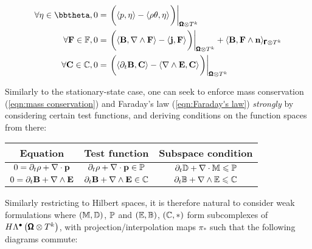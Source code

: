 \begin{align}
        \forall \eta \in \bbtheta,  0  &=  \left.\left(\langle p, \eta\rangle - \langle\rho\theta, \eta\rangle\tall\right)\right|_{\bfOmega\otimes T^{k}}  \\
        \forall \bfF \in \bbF,  0  &=  \left.\left(\langle\bfB, \nabla\wedge\bfF\rangle - \langle\bfj, \bfF\rangle\tall\right)\right|_{\bfOmega\otimes T^{k}} + \langle\bfB, \bfF\wedge\bfn\rangle_{\bfGamma\otimes T^{k}}  \\
        \forall \bfC \in \bbC,  0  &=  \left.\left(\langle\partial_{t}\bfB, \bfC\rangle - \langle\nabla\wedge\bfE, \bfC\rangle\tall\right)\right|_{\bfOmega\otimes T^{k}}
    \end{align}

    \line

     Similarly to the stationary-state case, one can seek to enforce mass conservation (\ref{eqn:mass conservation}) and Faraday's law (\ref{eqn:Faraday's law}) \emph{strongly} by considering certain test functions, and deriving conditions on the function spaces from there:
    \begin{center}\begin{tabular}{ c | c | c }
        Equation  &  Test function  &  Subspace condition  \\
        \hline\hline
        $0  =  \partial_{t}\rho + \nabla\cdot\mathbf{p}$  &  $\partial_{t}\rho + \nabla\cdot\mathbf{p}  \in  \mathbb{P}$  &  $\partial_{t}\mathbb{D} + \nabla\cdot\mathbb{M}  \leqslant  \mathbb{P}$  \\
        $0  =  \partial_{t}\mathbf{B} + \nabla\wedge\mathbf{E}$  &  $\partial_{t}\mathbf{B} + \nabla\wedge\mathbf{E}  \in  \mathbb{C}$  &  $\partial_{t}\mathbb{B} + \nabla\wedge\mathbb{E}  \leqslant  \mathbb{C}$
    \end{tabular}\end{center}
    Similarly restricting to Hilbert spaces, it is therefore natural to consider weak formulations where $(\mathbb{M}, \mathbb{D})$, $\mathbb{P}$ and $(\mathbb{E}, \mathbb{B})$, $(\mathbb{C}, *)$ form subcomplexes of $H\Lambda^{\bullet}\left(\pmb{\mathsf{\Omega}}\otimes T^{k}\right)$, with projection/interpolation maps $\pi_{*}$ such that the following diagrams commute:
